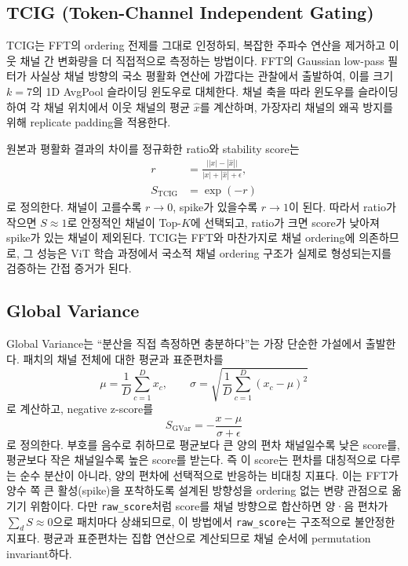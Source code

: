 \documentclass[10pt,twocolumn,letterpaper]{article}
\newcommand{\rawscore}{\texttt{raw\_score}}
\begin{document}
\subsection{TCIG (Token-Channel Independent Gating)}

TCIG는 FFT의 ordering 전제를 그대로 인정하되, 복잡한 주파수 연산을 제거하고 이웃 채널 간 변화량을 더 직접적으로 측정하는 방법이다. FFT의 Gaussian low-pass 필터가 사실상 채널 방향의 국소 평활화 연산에 가깝다는 관찰에서 출발하여, 이를 크기 $k=7$의 1D AvgPool 슬라이딩 윈도우로 대체한다. 채널 축을 따라 윈도우를 슬라이딩하여 각 채널 위치에서 이웃 채널의 평균 $\hat{x}$를 계산하며, 가장자리 채널의 왜곡 방지를 위해 replicate padding을 적용한다.

원본과 평활화 결과의 차이를 정규화한 ratio와 stability score는
\begin{align}
r &= \frac{\bigl||x|-|\hat{x}|\bigr|}{|x|+|\hat{x}|+\epsilon},\\
S_{\mathrm{TCIG}} &= \exp(-r)
\end{align}
로 정의한다. 채널이 고를수록 $r\to0$, spike가 있을수록 $r\to1$이 된다. 따라서 ratio가 작으면 $S\approx1$로 안정적인 채널이 Top-$K$에 선택되고, ratio가 크면 score가 낮아져 spike가 있는 채널이 제외된다. TCIG는 FFT와 마찬가지로 채널 ordering에 의존하므로, 그 성능은 ViT 학습 과정에서 국소적 채널 ordering 구조가 실제로 형성되는지를 검증하는 간접 증거가 된다.

\subsection{Global Variance}

Global Variance는 ``분산을 직접 측정하면 충분하다''는 가장 단순한 가설에서 출발한다. 패치의 채널 전체에 대한 평균과 표준편차를
\begin{equation}
\mu=\frac{1}{D}\sum_{c=1}^{D}x_c,\qquad
\sigma=\sqrt{\frac{1}{D}\sum_{c=1}^{D}(x_c-\mu)^2}
\end{equation}
로 계산하고, negative z-score를
\begin{equation}
S_{\mathrm{GVar}}=-\frac{x-\mu}{\sigma+\epsilon}
\end{equation}
로 정의한다. 부호를 음수로 취하므로 평균보다 큰 양의 편차 채널일수록 낮은 score를, 평균보다 작은 채널일수록 높은 score를 받는다. 즉 이 score는 편차를 대칭적으로 다루는 순수 분산이 아니라, 양의 편차에 선택적으로 반응하는 비대칭 지표다. 이는 FFT가 양수 쪽 큰 활성(spike)을 포착하도록 설계된 방향성을 ordering 없는 변량 관점으로 옮기기 위함이다. 다만 \rawscore{}처럼 score를 채널 방향으로 합산하면 양·음 편차가 $\sum_d S\approx0$으로 패치마다 상쇄되므로, 이 방법에서 \rawscore{}는 구조적으로 불안정한 지표다. 평균과 표준편차는 집합 연산으로 계산되므로 채널 순서에 permutation invariant하다.
\end{document}

